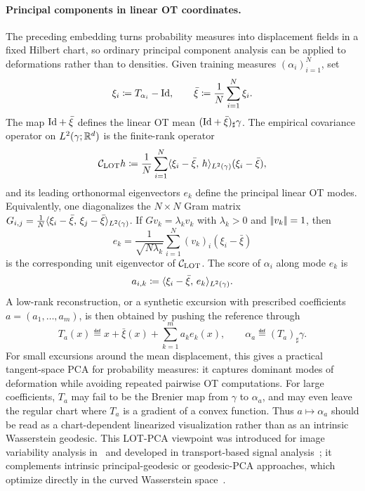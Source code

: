 \paragraph{Principal components in linear OT coordinates.}

The preceding embedding turns probability measures into displacement fields in a fixed Hilbert chart, so ordinary principal component analysis can be applied to deformations rather than to densities. Given training measures \((\alpha_i)_{i=1}^N\), set
\[
	\xi_i \coloneqq T_{\alpha_i}-\mathrm{Id},
	\qquad
	\bar\xi \coloneqq \frac1N\sum_{i=1}^N \xi_i.
\]
The map \(\mathrm{Id}+\bar\xi\) defines the linear OT mean \((\mathrm{Id}+\bar\xi)_\sharp\gamma\). The empirical covariance operator on \(L^2(\gamma;\mathbb{R}^d)\) is the finite-rank operator
\[
	\mathcal C_{\operatorname{LOT}} h
	\coloneqq
	\frac1N\sum_{i=1}^N
	\langle \xi_i-\bar\xi,\,h\rangle_{L^2(\gamma)}
	(\xi_i-\bar\xi),
\]
and its leading orthonormal eigenvectors \(e_k\) define the principal linear OT modes. Equivalently, one diagonalizes the \(N\times N\) Gram matrix \(G_{i,j}=\frac1N\langle \xi_i-\bar\xi,\,\xi_j-\bar\xi\rangle_{L^2(\gamma)}\). If \(Gv_k=\lambda_k v_k\) with \(\lambda_k>0\) and \(|\!| v_k |\!|=1\), then
\[
	e_k=\frac{1}{\sqrt{N\lambda_k}}\sum_{i=1}^N (v_k)_i(\xi_i-\bar\xi)
\]
is the corresponding unit eigenvector of \(\mathcal C_{\operatorname{LOT}}\). The score of \(\alpha_i\) along mode \(e_k\) is
\[
	a_{i,k} \coloneqq \langle \xi_i-\bar\xi,\,e_k\rangle_{L^2(\gamma)}.
\]
A low-rank reconstruction, or a synthetic excursion with prescribed coefficients \(a=(a_1,\ldots,a_m)\), is then obtained by pushing the reference through
\[
	T_a(x) \eqdef x+\bar\xi(x)+\sum_{k=1}^m a_k e_k(x),
	\qquad
	\alpha_a \eqdef (T_a)_\sharp\gamma.
\]
For small excursions around the mean displacement, this gives a practical tangent-space PCA for probability measures: it captures dominant modes of deformation while avoiding repeated pairwise OT computations. For large coefficients, \(T_a\) may fail to be the Brenier map from \(\gamma\) to \(\alpha_a\), and may even leave the regular chart where \(T_a\) is a gradient of a convex function. Thus \(a\mapsto \alpha_a\) should be read as a chart-dependent linearized visualization rather than as an intrinsic Wasserstein geodesic. This LOT-PCA viewpoint was introduced for image variability analysis in~\cite{wang2013linear} and developed in transport-based signal analysis~\cite{thorpe2017transportation,kolouri2017optimal}; it complements intrinsic principal-geodesic or geodesic-PCA approaches, which optimize directly in the curved Wasserstein space~\cite{SeguyCuturi,bigot2017geodesic}.

